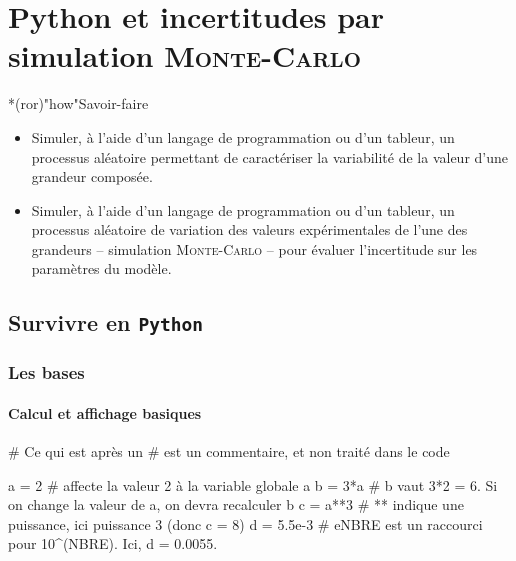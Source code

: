 \documentclass[a4paper, 12pt, garamond]{book}
\begin{document}
\setcounter{chapter}{5}

\chapter{Python et incertitudes par simulation \textsc{Monte-Carlo}}

\vfill

\begin{prgm}
	\begin{tcb}*(ror)"how"{Savoir-faire}
		\begin{itemize}[label=$\diamond$, leftmargin=10pt]
			\item Simuler, à l’aide d’un langage de programmation ou d’un tableur, un
			      processus aléatoire permettant de caractériser la variabilité de la
			      valeur d’une grandeur composée.
			\item Simuler, à l’aide d’un langage de programmation ou d’un tableur, un
			      processus aléatoire de variation des valeurs expérimentales de l’une des
			      grandeurs – simulation \textsc{Monte-Carlo} – pour évaluer l’incertitude
			      sur les paramètres du modèle.
		\end{itemize}
	\end{tcb}
\end{prgm}

\vfill
\minitoc
\vfill

\newpage

\section{Survivre en \texttt{Python}}
\subsection{Les bases}
\subsubsection{Calcul et affichage basiques}
\begin{python}
# Ce qui est après un # est un commentaire, et non traité dans le code

a = 2       # affecte la valeur 2 à la variable globale a
b = 3*a     # b vaut 3*2 = 6. Si on change la valeur de a, on devra recalculer b
c = a**3    # ** indique une puissance, ici puissance 3 (donc c = 8)
d = 5.5e-3  # eNBRE est un raccourci pour 10^(NBRE). Ici, d = 0.0055.
\end{python}
\end{document}
